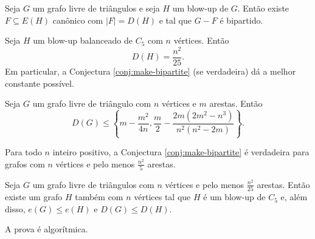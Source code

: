 \begin{theorem}[Simetrização]
  Seja $G$ um grafo livre de triângulos e seja $H$ um blow-up de $G$.
  Então existe $F \subseteq E(H)$ canônico com $|F|=D(H)$ e tal que $G-F$ é bipartido.
\end{theorem}

\begin{corollary}
  Seja $H$ um blow-up balanceado de $C_5$ com $n$ vértices.
  Então \[ D(H) = \frac{n^2}{25}. \]
  Em particular, a Conjectura \ref{conj:make-bipartite} (se verdadeira) dá a melhor constante possível.
\end{corollary}

\begin{theorem}[EFPS] \label{thm:EFPS-bounds}
  Seja $G$ um grafo livre de triângulo com $n$ vértices e $m$ arestas.
  Então \[ D(G) \leq \left\{m-\frac{m^2}{4n}, \frac{m}{2} - \frac{2m(2m^2-n^3)}{n^2(n^2-2m)}\right\}. \]
\end{theorem}

\begin{theorem} \label{thm:n2/5}
  Para todo $n$ inteiro positivo, a Conjectura \ref{conj:make-bipartite}
  é verdadeira para grafos com $n$ vértices e pelo menos $\frac{n^2}{5}$ arestas.
\end{theorem}

\begin{theorem}
  Seja $G$ um grafo livre de triângulos com $n$ vértices e pelo menos $\frac{n^2}{25}$ arestas.
  Então existe um grafo $H$ também com $n$ vértices tal que $H$ é um blow-up de $C_5$ e, além disso,
  $e(G) \leq e(H)$ e $D(G) \leq D(H)$.
\end{theorem}

A prova é algorítmica.